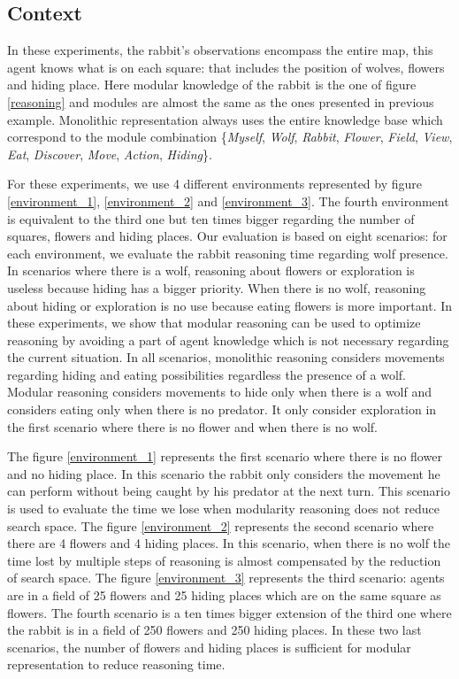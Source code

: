 \documentclass{aamas2012}
\begin{document}
\subsection{Context}
	
	In these experiments, the rabbit's observations encompass the entire map, 
	this agent knows what is on each square: that includes the position of wolves, flowers and hiding place.
	Here modular knowledge of the rabbit is the one of figure \ref{reasoning} and modules are almost the same as the ones presented in previous example.
	Monolithic representation always uses the entire knowledge base which correspond to the module combination
	\{\emph{Myself}, \emph{Wolf}, \emph{Rabbit}, \emph{Flower},  \emph{Field}, \emph{View}, \emph{Eat}, \emph{Discover}, \emph{Move}, \emph{Action}, \emph{Hiding}\}.

	For these experiments, we use 4 different environments represented by figure \ref{environment_1}, \ref{environment_2} and \ref{environment_3}.
	The fourth environment is equivalent to the third one but ten times bigger regarding the number of squares, flowers and hiding places.
	Our evaluation is based on eight scenarios: for each environment, we evaluate the rabbit reasoning time regarding wolf presence.
	In scenarios where there is a wolf, reasoning about flowers or exploration is useless because hiding has a bigger priority.
	When there is no wolf, reasoning about hiding or exploration is no use because eating flowers is more important.
	In these experiments, we show that modular reasoning can be used to optimize reasoning by avoiding a part of agent knowledge which 
	is not necessary regarding the current situation.
	In all scenarios, monolithic reasoning considers movements regarding hiding and eating possibilities regardless the presence of a wolf.
	Modular reasoning considers movements to hide only when there is a wolf and considers eating only when there is no predator.
	It only consider exploration in the first scenario where there is no flower and when there is no wolf.
	
	The figure \ref{environment_1} represents the first scenario where there is no flower and no hiding place.
	In this scenario the rabbit only considers the movement he can perform without being caught by his predator at the next turn.
	This scenario is used to evaluate the time we lose when modularity reasoning does not reduce search space.
	The figure \ref{environment_2} represents the second scenario where there are 4 flowers and 4 hiding places.
	In this scenario, when there is no wolf the time lost by multiple steps of reasoning is almost compensated by the reduction of search space.
	The figure \ref{environment_3} represents the third scenario: agents are in a field of 25 flowers and 25 hiding places which are on the same square as flowers.
	The fourth scenario is a ten times bigger extension of the third one where the rabbit is in a field of 250 flowers and 250 hiding places. 
	In these two last scenarios, the number of flowers and hiding places is sufficient for modular representation to reduce reasoning time.
	
\end{document}
